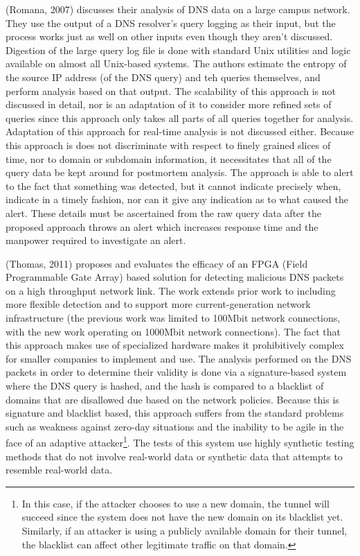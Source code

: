 \documentclass[12pt]{article}
\theoremstyle{remark}
\theoremstyle{definition}
\theoremstyle{definition}
\theoremstyle{definition}
\begin{document}
(Romana, 2007)\cite{Romana2007} discusses their analysis of DNS data on a large
campus network. They use the output of a DNS resolver's query logging as their
input, but the process works just as well on other inputs even though they
aren't discussed. Digestion of the large query log file is done with standard
Unix utilities and logic available on almost all Unix-based systems. The authors
estimate the entropy of the source IP address (of the DNS query) and teh queries
themselves, and perform analysis based on that output. The scalability of this
approach is not discussed in detail, nor is an adaptation of it to consider more
refined sets of queries since this approach only takes all parts of all queries
together for analysis. Adaptation of this approach for real-time analysis is not
discussed either. Because this approach is does not discriminate with respect to
finely grained slices of time, nor to domain or subdomain information, it
necessitates that all of the query data be kept around for postmortem analysis.
The approach is able to alert to the fact that something was detected, but it
cannot indicate precisely when, indicate in a timely fashion, nor can it give
any indication as to what caused the alert. These details must be ascertained
from the raw query data after the proposed approach throws an alert which
increases response time and the manpower required to investigate an alert.

(Thomas, 2011)\cite{Thomas2011} proposes and evaluates the efficacy of an FPGA
(Field Programmable Gate Array) based solution for detecting malicious DNS
packets on a high throughput network link. The work extends prior work to
including more flexible detection and to support more current-generation network
infrastructure (the previous work was limited to 100Mbit network connections,
with the new work operating on 1000Mbit network connections). The fact that this
approach makes use of specialized hardware makes it prohibitively complex for
smaller companies to implement and use. The analysis performed on the DNS
packets in order to determine their validity is done via a signature-based system
where the DNS query is hashed, and the hash is compared to a blacklist of
domains that are disallowed due based on the network policies. Because this is
signature and blacklist based, this approach suffers from the standard problems
such as weakness against zero-day situations and the inability to be agile in
the face of an adaptive attacker\footnote{In this case, if the attacker chooses
to use a new domain, the tunnel will succeed since the system does not have the
new domain on its blacklist yet. Similarly, if an attacker is using a publicly
available domain for their tunnel, the blacklist can affect other legitimate
traffic on that domain.}. The tests of this system use highly synthetic testing
methods that do not involve real-world data or synthetic data that attempts to
resemble real-world data.
\end{document}
